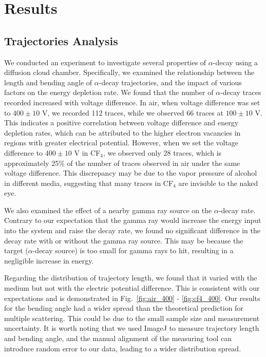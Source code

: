 \documentclass[letterpaper,12pt]{article}
\begin{document}
\section{Results}
\subsection{Trajectories Analysis}
We conducted an experiment to investigate several properties of $\alpha$-decay using a diffusion cloud chamber. Specifically, we examined the relationship between the length and bending angle of $\alpha$-decay trajectories, and the impact of various factors on the energy depletion rate. We found that the number of $\alpha$-decay traces recorded increased with voltage difference. In air, when voltage difference was set to $400\pm10$ V, we recorded 112 traces, while we observed 66 traces at $100\pm10$ V. This indicates a positive correlation between voltage difference and energy depletion rates, which can be attributed to the higher electron vacancies in regions with greater electrical potential.
However, when we set the voltage difference to $400\pm10$ V in CF$_4$, we observed only 28 traces, which is approximately 25\% of the number of traces observed in air under the same voltage difference. This discrepancy may be due to the vapor pressure of alcohol in different media, suggesting that many traces in CF$_4$ are invisible to the naked eye.

We also examined the effect of a nearby gamma ray source on the $\alpha$-decay rate. Contrary to our expectation that the gamma ray would increase the energy input into the system and raise the decay rate, we found no significant difference in the decay rate with or without the gamma ray source. This may be because the target ($\alpha$-decay source) is too small for gamma rays to hit, resulting in a negligible increase in energy.

Regarding the distribution of trajectory length, we found that it varied with the medium but not with the electric potential difference. This is consistent with our expectations and is demonstrated in Fig.~\ref{fig:air_400} - \ref{fig:cf4_400}. Our results for the bending angle had a wider spread than the theoretical prediction for multiple scattering. This could be due to the small sample size and measurement uncertainty. It is worth noting that we used ImageJ to measure trajectory length and bending angle, and the manual alignment of the measuring tool can introduce random error to our data, leading to a wider distribution spread.
\end{document}
